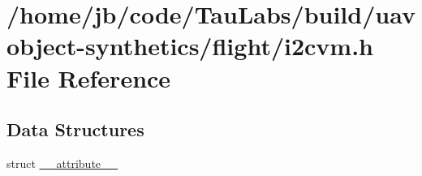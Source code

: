 \hypertarget{build_2uavobject-synthetics_2flight_2i2cvm_8h}{\section{/home/jb/code/\-Tau\-Labs/build/uavobject-\/synthetics/flight/i2cvm.h \-File \-Reference}
\label{build_2uavobject-synthetics_2flight_2i2cvm_8h}
}
\subsection*{\-Data \-Structures}
\begin{DoxyCompactItemize}
\item 
struct \hyperlink{struct____attribute____}{\-\_\-\-\_\-attribute\-\_\-\-\_\-}
\end{DoxyCompactItemize}
